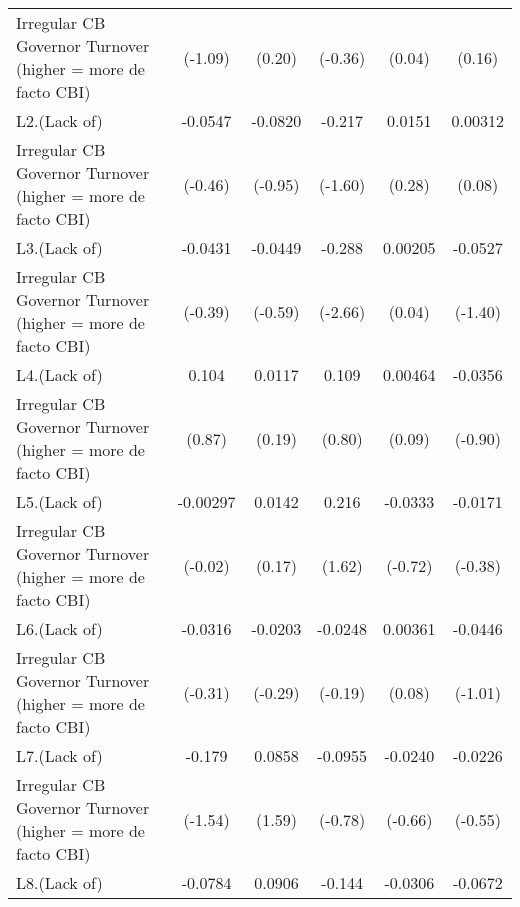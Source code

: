 {\begin{tabular}{l*{5}{c}}
Irregular CB Governor Turnover (higher = more de facto CBI)&     (-1.09)         &      (0.20)         &     (-0.36)         &      (0.04)         &      (0.16)         \\
[1em]
L2.(Lack of)        &     -0.0547         &     -0.0820         &      -0.217         &      0.0151         &     0.00312         \\
Irregular CB Governor Turnover (higher = more de facto CBI)&     (-0.46)         &     (-0.95)         &     (-1.60)         &      (0.28)         &      (0.08)         \\
[1em]
L3.(Lack of)        &     -0.0431         &     -0.0449         &      -0.288\sym{**} &     0.00205         &     -0.0527         \\
Irregular CB Governor Turnover (higher = more de facto CBI)&     (-0.39)         &     (-0.59)         &     (-2.66)         &      (0.04)         &     (-1.40)         \\
[1em]
L4.(Lack of)        &       0.104         &      0.0117         &       0.109         &     0.00464         &     -0.0356         \\
Irregular CB Governor Turnover (higher = more de facto CBI)&      (0.87)         &      (0.19)         &      (0.80)         &      (0.09)         &     (-0.90)         \\
[1em]
L5.(Lack of)        &    -0.00297         &      0.0142         &       0.216         &     -0.0333         &     -0.0171         \\
Irregular CB Governor Turnover (higher = more de facto CBI)&     (-0.02)         &      (0.17)         &      (1.62)         &     (-0.72)         &     (-0.38)         \\
[1em]
L6.(Lack of)        &     -0.0316         &     -0.0203         &     -0.0248         &     0.00361         &     -0.0446         \\
Irregular CB Governor Turnover (higher = more de facto CBI)&     (-0.31)         &     (-0.29)         &     (-0.19)         &      (0.08)         &     (-1.01)         \\
[1em]
L7.(Lack of)        &      -0.179         &      0.0858         &     -0.0955         &     -0.0240         &     -0.0226         \\
Irregular CB Governor Turnover (higher = more de facto CBI)&     (-1.54)         &      (1.59)         &     (-0.78)         &     (-0.66)         &     (-0.55)         \\
[1em]
L8.(Lack of)        &     -0.0784         &      0.0906         &      -0.144         &     -0.0306         &     -0.0672         \\

\end{tabular}}
